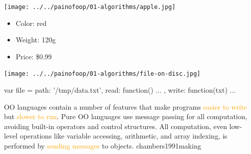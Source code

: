 \documentclass{article}
\newcommand\hlt[1]{\textcolor{orange}{#1}}
\begin{document}
  \begin{multicols}{2}
  \texttt{[image: ../../painofoop/01-algorithms/apple.jpg]}
  \begin{itemize}
  \setlength\itemsep{0em}
  \item Color: red
  \item Weight: 120g
  \item Price: \$0.99
  \end{itemize}
  \par\columnbreak\par
  \texttt{[image: ../../painofoop/01-algorithms/file-on-disc.jpg]}
  \par
{\small\begin{ffcode}
var file = {
  path: '/tmp/data.txt',
  read: function() { ... },
  write: function(txt) { ... }
}
\end{ffcode}
}
  \end{multicols}
  \plush{}


  {OO languages contain a number of features that make programs \hlt{easier to write} but \hlt{slower to run}. Pure OO languages use message passing for all computation, avoiding built-in operators and control structures. All computation, even low-level operations like variable accessing, arithmetic, and array indexing, is performed by \hlt{sending messages} to objects.}
  {chambers1991making}
\end{document}
